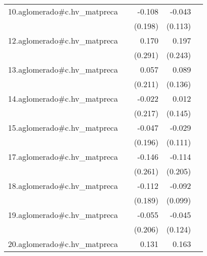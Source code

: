 {\begin{longtable}{l*{4}{D{.}{.}{-1}}}
\addlinespace
10.aglomerado#c.hv\_matpreca&                     &      -0.108         &      -0.043         &                     \\
            &                     &     (0.198)         &     (0.113)         &                     \\
\addlinespace
12.aglomerado#c.hv\_matpreca&                     &       0.170         &       0.197         &                     \\
            &                     &     (0.291)         &     (0.243)         &                     \\
\addlinespace
13.aglomerado#c.hv\_matpreca&                     &       0.057         &       0.089         &                     \\
            &                     &     (0.211)         &     (0.136)         &                     \\
\addlinespace
14.aglomerado#c.hv\_matpreca&                     &      -0.022         &       0.012         &                     \\
            &                     &     (0.217)         &     (0.145)         &                     \\
\addlinespace
15.aglomerado#c.hv\_matpreca&                     &      -0.047         &      -0.029         &                     \\
            &                     &     (0.196)         &     (0.111)         &                     \\
\addlinespace
17.aglomerado#c.hv\_matpreca&                     &      -0.146         &      -0.114         &                     \\
            &                     &     (0.261)         &     (0.205)         &                     \\
\addlinespace
18.aglomerado#c.hv\_matpreca&                     &      -0.112         &      -0.092         &                     \\
            &                     &     (0.189)         &     (0.099)         &                     \\
\addlinespace
19.aglomerado#c.hv\_matpreca&                     &      -0.055         &      -0.045         &                     \\
            &                     &     (0.206)         &     (0.124)         &                     \\
\addlinespace
20.aglomerado#c.hv\_matpreca&                     &       0.131         &       0.163         &                     \\

\end{longtable}}
